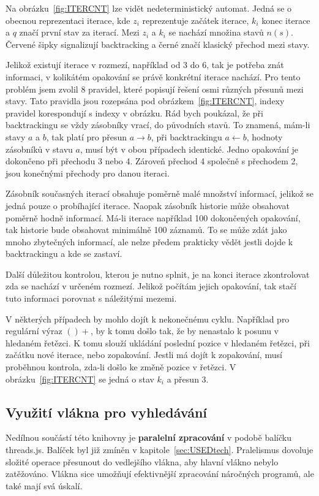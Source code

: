 Na obrázku~\ref{fig:ITERCNT} lze vidět nedeterministický automat. 
Jedná se o obecnou reprezentaci iterace, kde $z_i$ reprezentuje začátek iterace, $k_i$ konec iterace a $q$ značí první stav za iterací.
Mezi $z_i$ a $k_i$ se nachází množina stavů $n(s)$.
Červené šipky signalizují backtracking a černé značí klasický přechod mezi stavy.

Jelikož existují iterace v rozmezí, například od 3 do 6, tak je potřeba znát informaci, v kolikátém opakování se právě konkrétní iterace nachází.
Pro tento problém jsem zvolil 8 pravidel, které popisují řešení osmi různých přesunů mezi stavy.
Tato pravidla jsou rozepsána pod obrázkem~\ref{fig:ITERCNT}, indexy pravidel korespondují s indexy v obrázku.
Rád bych poukázal, že při backtrackingu se vždy zásobníky vrací, do původních stavů. 
To znamená, mám-li stavy $a$ a $b$, tak platí pro přesun $a \rightarrow b$, při backtrackingu $a \leftarrow b$, hodnoty zásobníků v stavu $a$, musí být v obou případech identické.
Jedno opakování je dokončeno při přechodu 3 nebo 4. 
Zároveň přechod 4 společně s přechodem 2, jsou konečnými přechody pro danou iteraci.

Zásobník současných iterací obsahuje poměrně malé množství informací, jelikož se jedná pouze o probíhající iterace.
Naopak zásobník historie může obsahovat poměrně hodně informací. 
Má-li iterace například 100 dokončených opakování, tak historie bude obsahovat minimálně 100 záznamů.
To se může zdát jako mnoho zbytečných informací, ale nelze předem prakticky vědět jestli dojde k backtrackingu a kde se zastaví.

Další důležitou kontrolou, kterou je nutno splnit, je na konci iterace zkontrolovat zda se nachází v určeném rozmezí.
Jelikož počítám jejich opakování, tak stačí tuto informaci porovnat s náležitými mezemi.

V některých případech by mohlo dojít k nekonečnému cyklu.
Například pro regulární výraz $()+$, by k tomu došlo tak, že by nenastalo k posunu v hledaném řetězci.
K tomu slouží ukládání poslední pozice v hledaném řetězci, při začátku nové iterace, nebo zopakování.
Jestli má dojít k zopakování, musí proběhnou kontrola, zda-li došlo ke změně pozice v řetězci.
V obrázku~\ref{fig:ITERCNT} se jedná o stav $k_i$ a přesun $3$.

\subsection*{Využití vlákna pro vyhledávání}
Nedílnou součástí této knihovny je \textbf{paralelní zpracování} v podobě balíčku threads.js.
Balíček byl již zmíněn v kapitole~\ref{sec:USEDtech}.
Pralelismus dovoluje složité operace přesunout do vedlejšího vlákna, aby hlavní vlákno nebylo zatěžováno.
Vlákna sice umožňují efektivnější zpracování náročných programů, ale také mají svá úskalí.

